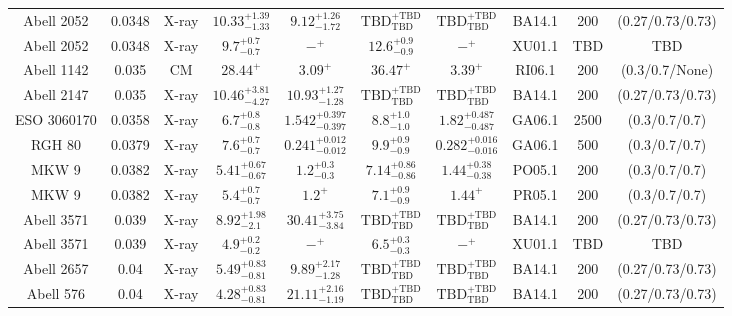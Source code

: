 \begin{table}
\begin{tabular}{cccccccccc}
Abell 2052 & 0.0348 & X-ray & ${10.33}^{+1.39}_{-1.33}$ & ${9.12}^{+1.26}_{-1.72}$ & ${\mathrm{TBD}}^{+\mathrm{TBD}}_{\mathrm{TBD}}$ & ${\mathrm{TBD}}^{+\mathrm{TBD}}_{\mathrm{TBD}}$ & BA14.1 & 200 & (0.27/0.73/0.73) \\
Abell 2052 & 0.0348 & X-ray & ${9.7}^{+0.7}_{-0.7}$ & ${-}^{+}_{}$ & ${12.6}^{+0.9}_{-0.9}$ & ${-}^{+}_{}$ & XU01.1 & TBD & TBD \\
Abell 1142 & 0.035 & CM & ${28.44}^{+}_{}$ & ${3.09}^{+}_{}$ & ${36.47}^{+}_{}$ & ${3.39}^{+}_{}$ & RI06.1 & 200 & (0.3/0.7/None) \\
Abell 2147 & 0.035 & X-ray & ${10.46}^{+3.81}_{-4.27}$ & ${10.93}^{+1.27}_{-1.28}$ & ${\mathrm{TBD}}^{+\mathrm{TBD}}_{\mathrm{TBD}}$ & ${\mathrm{TBD}}^{+\mathrm{TBD}}_{\mathrm{TBD}}$ & BA14.1 & 200 & (0.27/0.73/0.73) \\
ESO 3060170 & 0.0358 & X-ray & ${6.7}^{+0.8}_{-0.8}$ & ${1.542}^{+0.397}_{-0.397}$ & ${8.8}^{+1.0}_{-1.0}$ & ${1.82}^{+0.487}_{-0.487}$ & GA06.1 & 2500 & (0.3/0.7/0.7) \\
RGH 80 & 0.0379 & X-ray & ${7.6}^{+0.7}_{-0.7}$ & ${0.241}^{+0.012}_{-0.012}$ & ${9.9}^{+0.9}_{-0.9}$ & ${0.282}^{+0.016}_{-0.016}$ & GA06.1 & 500 & (0.3/0.7/0.7) \\
MKW 9 & 0.0382 & X-ray & ${5.41}^{+0.67}_{-0.67}$ & ${1.2}^{+0.3}_{-0.3}$ & ${7.14}^{+0.86}_{-0.86}$ & ${1.44}^{+0.38}_{-0.38}$ & PO05.1 & 200 & (0.3/0.7/0.7) \\
MKW 9 & 0.0382 & X-ray & ${5.4}^{+0.7}_{-0.7}$ & ${1.2}^{+}_{}$ & ${7.1}^{+0.9}_{-0.9}$ & ${1.44}^{+}_{}$ & PR05.1 & 200 & (0.3/0.7/0.7) \\
Abell 3571 & 0.039 & X-ray & ${8.92}^{+1.98}_{-2.1}$ & ${30.41}^{+3.75}_{-3.84}$ & ${\mathrm{TBD}}^{+\mathrm{TBD}}_{\mathrm{TBD}}$ & ${\mathrm{TBD}}^{+\mathrm{TBD}}_{\mathrm{TBD}}$ & BA14.1 & 200 & (0.27/0.73/0.73) \\
Abell 3571 & 0.039 & X-ray & ${4.9}^{+0.2}_{-0.2}$ & ${-}^{+}_{}$ & ${6.5}^{+0.3}_{-0.3}$ & ${-}^{+}_{}$ & XU01.1 & TBD & TBD \\
Abell 2657 & 0.04 & X-ray & ${5.49}^{+0.83}_{-0.81}$ & ${9.89}^{+2.17}_{-1.28}$ & ${\mathrm{TBD}}^{+\mathrm{TBD}}_{\mathrm{TBD}}$ & ${\mathrm{TBD}}^{+\mathrm{TBD}}_{\mathrm{TBD}}$ & BA14.1 & 200 & (0.27/0.73/0.73) \\
Abell 576 & 0.04 & X-ray & ${4.28}^{+0.83}_{-0.81}$ & ${21.11}^{+2.16}_{-1.19}$ & ${\mathrm{TBD}}^{+\mathrm{TBD}}_{\mathrm{TBD}}$ & ${\mathrm{TBD}}^{+\mathrm{TBD}}_{\mathrm{TBD}}$ & BA14.1 & 200 & (0.27/0.73/0.73) \\

\end{tabular}
\end{table}
